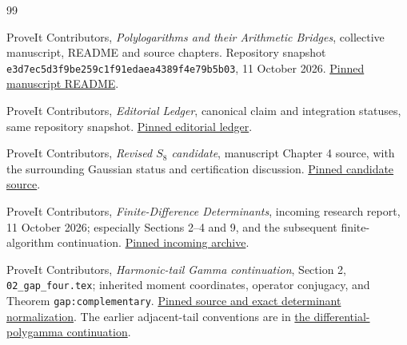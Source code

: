 \documentclass[11pt,a4paper]{article}
\numberwithin{equation}{section}
\theoremstyle{definition}
\theoremstyle{remark}
\newcommand{\repo}{\texttt{e3d7ec5d3f9be259c1f91edaea4389f4e79b5b03}}
\begin{document}
\clearpage
\begin{thebibliography}{99}
\raggedright

ProveIt Contributors,
\emph{Polylogarithms and their Arithmetic Bridges}, collective
manuscript, README and source chapters.
Repository snapshot \repo, 11 October 2026.
\href{https://github.com/VladimirReshetnikov/ProveIt/blob/e3d7ec5d3f9be259c1f91edaea4389f4e79b5b03/Analysis/Polylogarithms/docs/manuscript/README.md}{Pinned manuscript README}.

ProveIt Contributors,
\emph{Editorial Ledger}, canonical claim and integration statuses,
same repository snapshot.
\href{https://github.com/VladimirReshetnikov/ProveIt/blob/e3d7ec5d3f9be259c1f91edaea4389f4e79b5b03/Analysis/Polylogarithms/docs/manuscript/EDITORIAL-LEDGER.md}{Pinned editorial ledger}.

ProveIt Contributors,
\emph{Revised \(S_8\) candidate}, manuscript Chapter 4 source,
with the surrounding Gaussian status and certification discussion.
\href{https://github.com/VladimirReshetnikov/ProveIt/blob/e3d7ec5d3f9be259c1f91edaea4389f4e79b5b03/Analysis/Polylogarithms/docs/manuscript/chapters/04-S8-candidate.tex}{Pinned candidate source}.

ProveIt Contributors,
\emph{Finite-Difference Determinants}, incoming research report,
11 October 2026; especially Sections 2--4 and 9, and the subsequent
finite-algorithm continuation.
\href{https://github.com/VladimirReshetnikov/ProveIt/blob/e3d7ec5d3f9be259c1f91edaea4389f4e79b5b03/docs/incoming/ProveIt_Finite_Difference_Determinants_2026-10-11.zip}{Pinned incoming archive}.

ProveIt Contributors,
\emph{Harmonic-tail Gamma continuation}, Section 2,
\texttt{02\_gap\_four.tex}; inherited moment coordinates,
operator conjugacy, and Theorem \texttt{gap:complementary}.
\href{https://github.com/VladimirReshetnikov/ProveIt/blob/e3d7ec5d3f9be259c1f91edaea4389f4e79b5b03/Analysis/Polylogarithms/docs/reports/stieltjes-harmonic-resonance/continuations/harmonic-tail-gamma/sections/02_gap_four.tex}{Pinned source and exact determinant normalization}.
The earlier adjacent-tail conventions are in
\href{https://github.com/VladimirReshetnikov/ProveIt/blob/e3d7ec5d3f9be259c1f91edaea4389f4e79b5b03/Analysis/Polylogarithms/docs/reports/stieltjes-harmonic-resonance/continuations/differential-polygamma-lerch-jets/sections/08_adjacent_tails.tex}{the differential-polygamma continuation}.


\end{thebibliography}
\end{document}
